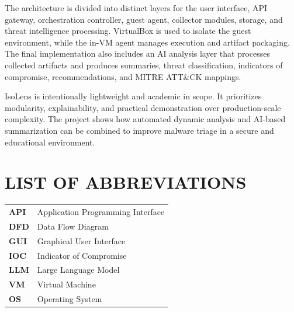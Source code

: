 \documentclass[a4paper,12pt,oneside]{report}
\begin{document}
\par

\par

The architecture is divided into distinct layers for the user interface, API gateway, orchestration controller, guest agent, collector modules, storage, and threat intelligence processing. VirtualBox is used to isolate the guest environment, while the in-VM agent manages execution and artifact packaging. The final implementation also includes an AI analysis layer that processes collected artifacts and produces summaries, threat classification, indicators of compromise, recommendations, and MITRE ATT\&CK mappings.

\par

\par

IsoLens is intentionally lightweight and academic in scope. It prioritizes modularity, explainability, and practical demonstration over production-scale complexity. The project shows how automated dynamic analysis and AI-based summarization can be combined to improve malware triage in a secure and educational environment.

\newpage
\tableofcontents

\newpage
\listoffigures
{}

\newpage
\listoftables
{}

\newpage
\chapter*{\uppercase{List of Abbreviations}}
\begin{table}[H]
\renewcommand{\arraystretch}{1.5}
\begin{tabularx}{\textwidth}{>{\bfseries}l X}
API & Application Programming Interface \\
DFD & Data Flow Diagram \\
GUI & Graphical User Interface \\
IOC & Indicator of Compromise \\
LLM & Large Language Model \\
VM & Virtual Machine \\
OS & Operating System \\
\end{tabularx}
\end{table}
\end{document}
